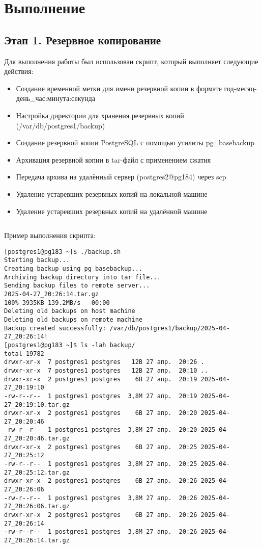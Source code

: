 \section{Выполнение}

\subsection{Этап 1. Резервное копирование}

Для выполнения работы был использован скрипт, который выполняет следующие действия:

\begin{itemize}
    \item Создание временной метки для имени резервной копии в формате год-месяц-день\-\_час:минута:секунда
    \item Настройка директории для хранения резервных копий (/var/db/postgres1/backup)
    \item Создание резервной копии PostgreSQL с помощью утилиты pg\_basebackup
    \item Архивация резервной копии в tar-файл с применением сжатия
    \item Передача архива на удалённый сервер (postgres2@pg184) через scp
    \item Удаление устаревших резервных копий на локальной машине
    \item Удаление устаревших резервных копий на удалённой машине
\end{itemize}

\inputminted[breaklines,linenos,frame=single]{bash}{backup.sh}

Пример выполнения скрипта:

\begin{verbatim}
[postgres1@pg183 ~]$ ./backup.sh
Starting backup...
Creating backup using pg_basebackup...
Archiving backup directory into tar file...
Sending backup files to remote server...
2025-04-27_20:26:14.tar.gz                                                                                                                             100% 3935KB 139.2MB/s   00:00
Deleting old backups on host machine
Deleting old backups on remote machine
Backup created successfully: /var/db/postgres1/backup/2025-04-27_20:26:14!
[postgres1@pg183 ~]$ ls -lah backup/
total 19782
drwxr-xr-x  7 postgres1 postgres   12B 27 апр.  20:26 .
drwxr-xr-x  7 postgres1 postgres   12B 27 апр.  20:10 ..
drwxr-xr-x  2 postgres1 postgres    6B 27 апр.  20:19 2025-04-27_20:19:10
-rw-r--r--  1 postgres1 postgres  3,8M 27 апр.  20:19 2025-04-27_20:19:10.tar.gz
drwxr-xr-x  2 postgres1 postgres    6B 27 апр.  20:20 2025-04-27_20:20:46
-rw-r--r--  1 postgres1 postgres  3,8M 27 апр.  20:20 2025-04-27_20:20:46.tar.gz
drwxr-xr-x  2 postgres1 postgres    6B 27 апр.  20:25 2025-04-27_20:25:12
-rw-r--r--  1 postgres1 postgres  3,8M 27 апр.  20:25 2025-04-27_20:25:12.tar.gz
drwxr-xr-x  2 postgres1 postgres    6B 27 апр.  20:26 2025-04-27_20:26:06
-rw-r--r--  1 postgres1 postgres  3,8M 27 апр.  20:26 2025-04-27_20:26:06.tar.gz
drwxr-xr-x  2 postgres1 postgres    6B 27 апр.  20:26 2025-04-27_20:26:14
-rw-r--r--  1 postgres1 postgres  3,8M 27 апр.  20:26 2025-04-27_20:26:14.tar.gz
\end{verbatim}

